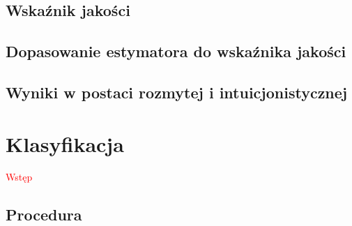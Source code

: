 \documentclass[12pt,a4paper,oneside]{book}
\theoremstyle{definition}
\begin{document}
\section{Wskaźnik jakości}

\section{Dopasowanie estymatora do wskaźnika jakości}

\section{Wyniki w postaci rozmytej i intuicjonistycznej}

\chapter{Klasyfikacja} \label{chap:classification}

\textcolor{red}{Wstęp}

\section{Procedura}
\end{document}
